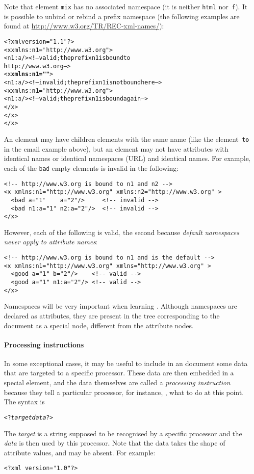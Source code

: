 Note that element \texttt{mix} has no associated namespace (it is
neither \texttt{html} nor~\texttt{f}). It is possible to unbind or
rebind a prefix namespace (the following examples are found at
\url{http://www.w3.org/TR/REC-xml-names/}):
\begin{alltt}
<?xml version="1.1"?>
<x xmlns:n1="http://www.w3.org">
  <n1:a/> <!-- valid; the prefix n1 is bound to                    
               http://www.w3.org -->
    <x \textbf{xmlns:n1=""}>
      <n1:a/> <!-- invalid; the prefix n1 is not bound here -->
      <x xmlns:n1="http://www.w3.org">
        <n1:a/> <!-- valid; the prefix n1 is bound again -->
      </x>
   </x>
</x>
\end{alltt}



\noindent An element may have children elements with the same name
(like the element~\texttt{to} in the email example above), but an
element may not have attributes with identical names or identical
namespaces (URL) and identical names. For example, each of the
\texttt{bad} empty elements is invalid in the following:
\begin{verbatim}
<!-- http://www.w3.org is bound to n1 and n2 -->
<x xmlns:n1="http://www.w3.org" xmlns:n2="http://www.w3.org" >
  <bad a="1"    a="2"/>     <!-- invalid -->
  <bad n1:a="1" n2:a="2"/>  <!-- invalid -->
</x>
\end{verbatim}
However, each of the following is valid, the second because
\emph{default namespaces never apply to attribute names}:
\begin{verbatim}
<!-- http://www.w3.org is bound to n1 and is the default -->
<x xmlns:n1="http://www.w3.org" xmlns="http://www.w3.org" >
  <good a="1" b="2"/>    <!-- valid -->
  <good a="1" n1:a="2"/> <!-- valid -->
</x>
\end{verbatim}
Namespaces will be very important when learning \XSLT. Although
namespaces are declared as attributes, they are present in the \XML
tree corresponding to the document as a special node, different from
the attribute nodes.

\paragraph{Processing instructions}

In some exceptional cases, it may be useful to include in an \XML
document some data that are targeted to a specific \XML
processor. These data are then embedded in a special element, and the
data themselves are called a \emph{processing instruction} because
they tell a particular processor, for instance, \Saxon, what to do at
this point. The syntax is
\begin{alltt}
<?\textit{target} \textit{data}?>
\end{alltt}
The \emph{target} is a string supposed to be recognised by a specific
\XML processor and the \emph{data} is then used by this
processor. Note that the data takes the shape of attribute values, and
may be absent. For example:
\begin{verbatim}
<?xml version="1.0"?>
\end{verbatim}

